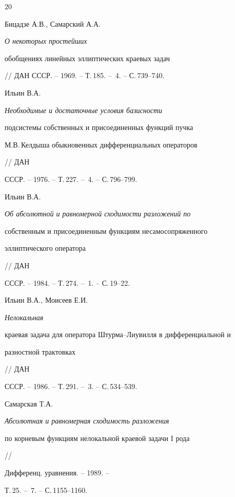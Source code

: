 \begin{thebibliography}{20}







Бицадзе А.В., Самарский А.А. {\em О некоторых простейших


обобщениях линейных эллиптических краевых задач}


// ДАН СССР. -- 1969. -- Т.\,185. -- \No\,4. -- С.\,739--740.







Ильин В.А. {\em Необходимые и достаточные условия базисности


подсистемы собственных и присоединенных функций пучка 


М.В.\,Келдыша обыкновенных дифференциальных операторов} // ДАН


СССР. -- 1976. -- Т.\,227. -- \No\,4. -- С.\,796--799.







Ильин В.А. {\em Об абсолютной и равномерной сходимости разложений по


собственным и присоединенным функциям несамосопряженного


эллиптического оператора} // ДАН


СССР. -- 1984. -- Т.\,274. -- \No\,1. -- С.\,19--22.







Ильин В.А., Моисеев Е.И. {\em Нелокальная


краевая задача для оператора Штурма--Лиувилля в дифференциальной и


разностной трактовках} // ДАН


СССР. -- 1986. -- Т.\,291. -- \No\,3. -- С.\,534--539.







Самарская Т.А. {\em Абсолютная и равномерная сходимость разложения


по корневым функциям нелокальной краевой задачи $\mathrm I$ рода} //


Дифференц. уравнения. -- 1989. --


Т.\,25. -- \No\,7. -- С.\,1155--1160.






\end{thebibliography}

